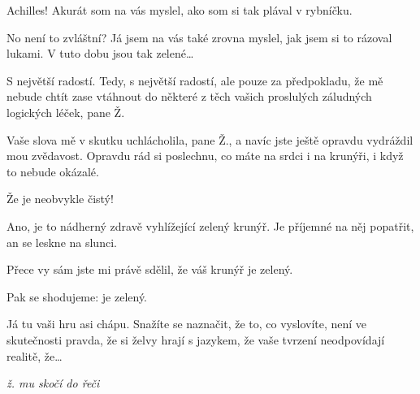 \documentclass[12pt]{article}
\begin{document}
\begin{description}[itemsep=0pt]

\item[Ž:] Achilles! Akurát som na vás myslel, ako som si tak plával v rybníčku.

\item[A:] No není to zvláštní? Já jsem na vás také zrovna myslel, jak jsem si
    to rázoval lukami. V tuto dobu jsou tak zelené…

\item[Ž:] 

\item[A:] S největší radostí. Tedy, s největší radostí, ale pouze za předpokladu,
    že mě nebude chtít zase vtáhnout do některé z těch vašich proslulých
    záludných logických léček, pane Ž.

\item[Ž:]

\item[A:] Vaše slova mě v skutku uchlácholila, pane Ž., a navíc jste ještě opravdu
    vydráždil mou zvědavost. Opravdu rád si poslechnu, co máte na srdci i na krunýři,
    i když to nebude okázalé.

\item[Ž:]

\item[A:] Že je neobvykle čistý!

\item[Ž:]

\item[A:] Ano, je to nádherný zdravě vyhlížející zelený krunýř. Je příjemné
    na něj popatřit, an se leskne na slunci.

\item[Ž:]

\item[A:] Přece vy sám jste mi právě sdělil, že váš krunýř je zelený.

\item[Ž:]

\item[A:] Pak se shodujeme: je zelený.

\item[Ž:]

\item[A:] Já tu vaši hru asi chápu. Snažíte se naznačit, že to, co vyslovíte,
    není ve skutečnosti pravda, že si želvy hrají s jazykem, že vaše tvrzení neodpovídají
    realitě, že…


    \bigskip
\textit{ž. mu skočí do řeči}
\item[Ž:]


\end{description}
\end{document}
